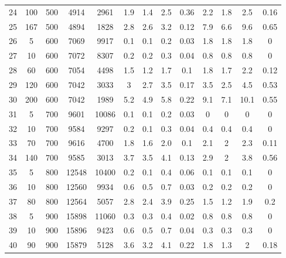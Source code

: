 \documentclass[11pt]{article}
\begin{document}
\begin{landscape}
\begin{longtable}[c]{ccccc|cccc|cccc}
		\rowcolor[HTML]{EFEFEF} 
		24 & 100 & 500 & 4914 & 2961 & 1.9 & 1.4 & 2.5 & 0.36 & 2.2 & 1.8 & 2.5 & 0.16 \\
		\rowcolor[HTML]{EFEFEF} 
		25 & 167 & 500 & 4894 & 1828 & 2.8 & 2.6 & 3.2 & 0.12 & 7.9 & 6.6 & 9.6 & 0.65 \\
		26 & 5 & 600 & 7069 & 9917 & 0.1 & 0.1 & 0.2 & 0.03 & 1.8 & 1.8 & 1.8 & 0 \\
		27 & 10 & 600 & 7072 & 8307 & 0.2 & 0.2 & 0.3 & 0.04 & 0.8 & 0.8 & 0.8 & 0 \\
		28 & 60 & 600 & 7054 & 4498 & 1.5 & 1.2 & 1.7 & 0.1 & 1.8 & 1.7 & 2.2 & 0.12 \\
		29 & 120 & 600 & 7042 & 3033 & 3 & 2.7 & 3.5 & 0.17 & 3.5 & 2.5 & 4.5 & 0.53 \\
		30 & 200 & 600 & 7042 & 1989 & 5.2 & 4.9 & 5.8 & 0.22 & 9.1 & 7.1 & 10.1 & 0.55 \\
		\rowcolor[HTML]{EFEFEF} 
		31 & 5 & 700 & 9601 & 10086 & 0.1 & 0.1 & 0.2 & 0.03 & 0 & 0 & 0 & 0 \\
		\rowcolor[HTML]{EFEFEF} 
		32 & 10 & 700 & 9584 & 9297 & 0.2 & 0.1 & 0.3 & 0.04 & 0.4 & 0.4 & 0.4 & 0 \\
		\rowcolor[HTML]{EFEFEF} 
		33 & 70 & 700 & 9616 & 4700 & 1.8 & 1.6 & 2.0 & 0.1 & 2.1 & 2 & 2.3 & 0.11 \\
		\rowcolor[HTML]{EFEFEF} 
		34 & 140 & 700 & 9585 & 3013 & 3.7 & 3.5 & 4.1 & 0.13 & 2.9 & 2 & 3.8 & 0.56 \\
		35 & 5 & 800 & 12548 & 10400 & 0.2 & 0.1 & 0.4 & 0.06 & 0.1 & 0.1 & 0.1 & 0 \\
		36 & 10 & 800 & 12560 & 9934 & 0.6 & 0.5 & 0.7 & 0.03 & 0.2 & 0.2 & 0.2 & 0 \\
		37 & 80 & 800 & 12564 & 5057 & 2.8 & 2.4 & 3.9 & 0.25 & 1.5 & 1.2 & 1.9 & 0.2 \\
		\rowcolor[HTML]{EFEFEF} 
		38 & 5 & 900 & 15898 & 11060 & 0.3 & 0.3 & 0.4 & 0.02 & 0.8 & 0.8 & 0.8 & 0 \\
		\rowcolor[HTML]{EFEFEF} 
		39 & 10 & 900 & 15896 & 9423 & 0.6 & 0.5 & 0.7 & 0.04 & 0.3 & 0.3 & 0.3 & 0 \\
		\rowcolor[HTML]{EFEFEF} 
		40 & 90 & 900 & 15879 & 5128 & 3.6 & 3.2 & 4.1 & 0.22 & 1.8 & 1.3 & 2 & 0.18
	\end{longtable}
\end{landscape}
\end{document}
